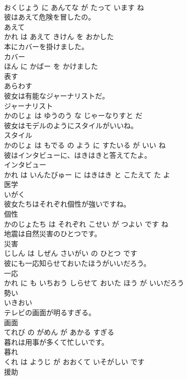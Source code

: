 \documentclass[8pt]{extreport}
\begin{document}
\begin{CJK}{UTF8}{min}
\\	おくじょう に あんてな が たって います ね			
\\	彼はあえて危険を冒したの。	
\\	あえて 
\\	かれ は あえて きけん を おかした			
\\	本にカバーを掛けました。	
\\	カバー 
\\	ほん に かばー を かけました			
\\	表す	
\\	あらわす		
\\	彼女は有能なジャーナリストだ。	
\\	ジャーナリスト 
\\	かのじょ は ゆうのう な じゃーなりすと だ			
\\	彼女はモデルのようにスタイルがいいね。	
\\	スタイル 
\\	かのじょ は もでる の よう に すたいる が いい ね			
\\	彼はインタビューに、はきはきと答えてたよ。	
\\	インタビュー 
\\	かれ は いんたびゅー に はきはき と こたえて た よ			
\\	医学	
\\	いがく		
\\	彼女たちはそれぞれ個性が強いですね。	
\\	個性 
\\	かのじょたち は それぞれ こせい が つよい です ね			
\\	地震は自然災害のひとつです。	
\\	災害 
\\	じしん は しぜん さいがい の ひとつ です			
\\	彼にも一応知らせておいたほうがいいだろう。	
\\	一応 
\\	かれ に も いちおう しらせて おいた ほう が いいだろう			
\\	勢い	
\\	いきおい		
\\	テレビの画面が明るすぎる。	
\\	画面 
\\	てれび の がめん が あかる すぎる			
\\	暮れは用事が多くて忙しいです。	
\\	暮れ 
\\	くれ は ようじ が おおくて いそがしい です			
\\	援助	

\end{CJK}
\end{document}
